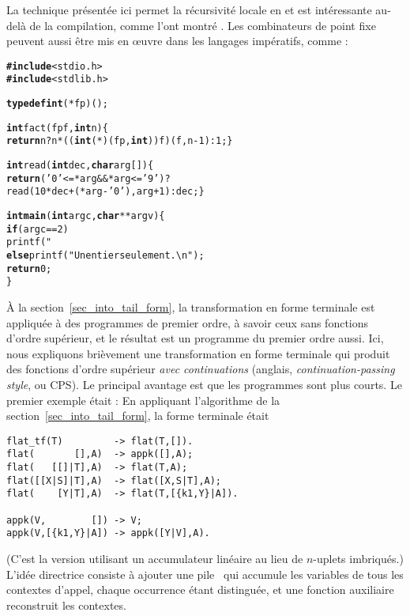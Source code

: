 La technique présentée ici permet la récursivité locale en \Erlang et
est intéressante au-delà de la compilation, comme l'ont montré
\cite{GoldbergWiener_2009}. Les combinateurs de point fixe peuvent
aussi être mis en {\oe}uvre dans les langages impératifs, comme
\Clang:
\begin{alltt}
\textbf{#include}<stdio.h>
\textbf{#include}<stdlib.h>

\textbf{typedef int} (*fp)();

\textbf{int} fact(fp f, \textbf{int} n) \{
  \textbf{return} n? n * ((\textbf{int} (*)(fp,\textbf{int}))f)(f,n-1) : 1; \}

\textbf{int} read(\textbf{int} dec, \textbf{char} arg[]) \{
  \textbf{return} ('0' <= *arg && *arg <= '9')? 
         read(10*dec+(*arg - '0'),arg+1) : dec; \}

\textbf{int main}(\textbf{int} argc, \textbf{char}** argv) \{
  \textbf{if} (argc == 2) 
     printf("%u\textbackslash{n}",fact(&fact,read(0,argv[1])));
  \textbf{else} printf("Un entier seulement.\textbackslash{n}");
  \textbf{return} 0;
\}
\end{alltt}


À la section~\ref{sec_into_tail_form}, la transformation en forme
terminale est appliquée à des programmes de premier ordre, à savoir
ceux sans fonctions d'ordre supérieur, et le résultat est un programme
du premier ordre aussi. Ici, nous expliquons brièvement une
transformation en forme terminale qui produit des fonctions d'ordre
supérieur \emph{avec continuations} (anglais,
\emph{continuation-passing style}, ou CPS). Le principal avantage est
que les programmes sont plus courts. Le premier exemple était
:  En appliquant l'algorithme
de la section~\ref{sec_into_tail_form}, la forme terminale était
\begin{verbatim}
flat_tf(T)         -> flat(T,[]).
flat(       [],A)  -> appk([],A);
flat(   [[]|T],A)  -> flat(T,A);
flat([[X|S]|T],A)  -> flat([X,S|T],A);
flat(    [Y|T],A)  -> flat(T,[{k1,Y}|A]).

appk(V,        []) -> V;
appk(V,[{k1,Y}|A]) -> appk([Y|V],A).
\end{verbatim}
(C'est la version utilisant un accumulateur linéaire au lieu de
\(n\)-uplets imbriqués.) L'idée directrice consiste à ajouter une
pile~ qui accumule les variables de tous les contextes
d'appel, chaque occurrence étant distinguée, et une fonction
auxiliaire  reconstruit les contextes.

